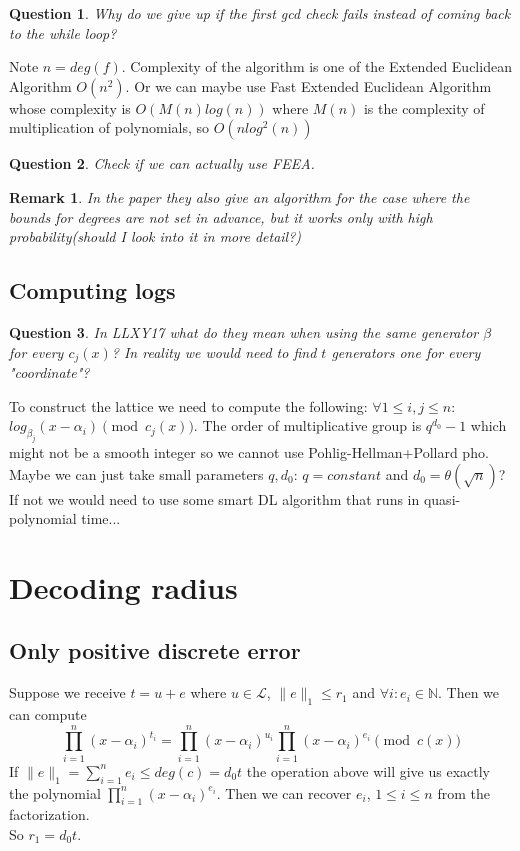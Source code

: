 \documentclass[12pt]{article}
\newtheorem{question}{Question}
\newtheorem{remark}{Remark}
\begin{document}
\begin{question}
Why do we give up if the first gcd check fails instead of coming back to the while loop?
\end{question}
Note $n = deg(f)$.
Complexity of the algorithm is one of the Extended Euclidean Algorithm $O(n^2)$. Or we can maybe use Fast Extended Euclidean Algorithm whose complexity is $O(M(n)log(n))$ where $M(n)$ is the complexity of multiplication of polynomials, so $O(nlog^2(n))$
\begin{question}
Check if we can actually use FEEA.
\end{question}
\begin{remark}
In the paper they also give an algorithm for the case where the bounds for degrees are not set in advance, but it works only with high probability(should I look into it in more detail?)
\end{remark}
\subsection{Computing logs}
\begin{question}
In LLXY17 what do they mean when using the same generator $\beta$ for every $c_j(x)$? In reality we would need to find $t$ generators one for every "coordinate"?
\end{question}
To construct the lattice we need to compute the following:
$\forall 1 \leq i,j \leq n :$ $log_{\beta_j}(x - \alpha_i) \pmod{c_j(x)}$. The order of multiplicative group is $q^{d_0} - 1$ which might not be a smooth integer so we cannot use Pohlig-Hellman+Pollard pho. Maybe we can just take small parameters $q, d_0$: $q=constant$ and $d_0 = \theta(\sqrt n)$? If not we would need to use some smart DL algorithm that runs in quasi-polynomial time...

\section{Decoding radius}

\subsection{Only positive discrete error}
Suppose we receive $t = u + e$ where $u \in \mathcal{L}$, $\|e\|_1 \leq r_1$ and $\forall i: e_i \in \mathbb{N}$. Then we can compute 
\begin{equation}
\prod_{i = 1}^{n}(x - \alpha_i)^{t_i} = \prod_{i = 1}^{n}(x - \alpha_i)^{u_i}\prod_{i = 1}^{n}(x - \alpha_i)^{e_i} \pmod{c(x)}
\end{equation}
If $\|e\|_1 = \sum_{i =1}^{n} e_i \leq deg(c) = d_0t$ the operation above will give us exactly the polynomial $\prod_{i = 1}^{n}(x - \alpha_i)^{e_i}$. Then we can recover $e_i$, $1 \leq i \leq n$ from the factorization.\\
So $r_1 = d_0t$.
\end{document}
